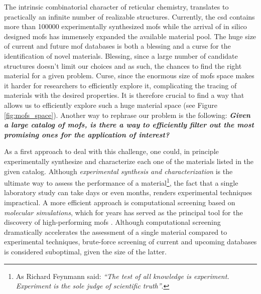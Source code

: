 The intrinsic combinatorial character of reticular chemistry, translates to
practically an infinite number of realizable structures. Currently, the
\gls{csd} contains more than \num{100000} experimentally synthesized \glspl{mof}
\parencite{siegel29} while the arrival of in silico designed \glspl{mof}
\parencite{siegel36, Rosen2021, Chung2019, chong51, DeVos2023, trillions,
Boyd_2019} has immensely expanded the available material pool. The huge size of
current and future \gls{mof} databases \parencite{trillions} is
both a blessing and a curse for the identification of novel materials. Blessing,
since a large number of candidate structures doesn't limit our choices and as
such, the chances to find the right material for a given problem. Curse, since
the enormous size of \glspl{mof} space makes it harder for researchers to
efficiently explore it, complicating the tracing of materials with the desired
properties. It is therefore crucial to find a way that allows us to efficiently
explore such a huge material space (see Figure \ref{fig:mofs_space}). Another way
to rephrase our problem is the following: \emph{\bfseries Given a large catalog
of \glspl{mof}, is there a way to efficiently filter out the most promising ones
for the application of interest?}

As a first approach to deal with this challenge, one could, in principle
experimentally synthesize and characterize each one of the materials listed in
the given catalog. Although \emph{experimental synthesis and
characterization} is the ultimate way to assess the performance of a
material\footnote{As Richard Feynmann said: \emph{``The test of all knowledge is
experiment. Experiment is the sole judge of scientific truth''}.}, the fact that
a single laboratory study can take days or even months, renders experimental
techniques impractical.  A more efficient approach is computational
screening based on \emph{molecular
simulations}, which for years has served as the
principal tool for the discovery of high-performing \glspl{mof}
\parencite{Simon2015, chong56, Moghadam2018, chong58, chong59}. Although computational
screening dramatically accelerates the assessment of a single material compared
to experimental techniques, brute-force screening of current and upcoming
databases is considered suboptimal, given the size of the latter.

